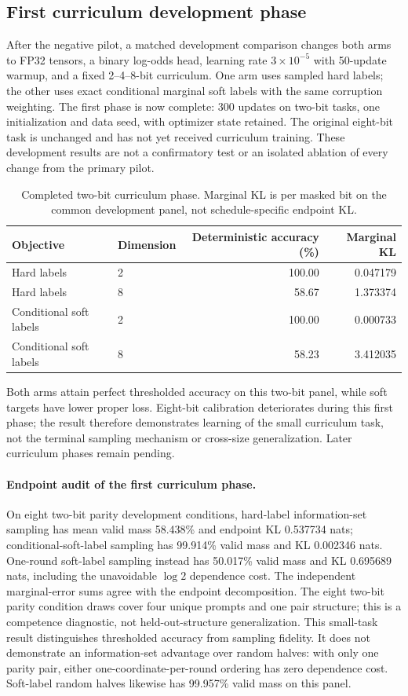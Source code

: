 \subsection{First curriculum development phase}
After the negative pilot, a matched development comparison changes both arms to FP32 tensors, a binary log-odds head, learning rate $3\times10^{-5}$ with 50-update warmup, and a fixed 2--4--8-bit curriculum. One arm uses sampled hard labels; the other uses exact conditional marginal soft labels with the same corruption weighting. The first phase is now complete: 300 updates on two-bit tasks, one initialization and data seed, with optimizer state retained. The original eight-bit task is unchanged and has not yet received curriculum training. These development results are not a confirmatory test or an isolated ablation of every change from the primary pilot.
\begin{table}[htbp]\centering\small
\caption{Completed two-bit curriculum phase. Marginal KL is per masked bit on the common development panel, not schedule-specific endpoint KL.}
\begin{tabular}{@{}llrr@{}}\toprule
Objective & Dimension & Deterministic accuracy (\%) & Marginal KL\\\midrule
Hard labels & 2 & 100.00 & 0.047179\\
Hard labels & 8 & 58.67 & 1.373374\\
Conditional soft labels & 2 & 100.00 & 0.000733\\
Conditional soft labels & 8 & 58.23 & 3.412035\\
\bottomrule\end{tabular}\end{table}
Both arms attain perfect thresholded accuracy on this two-bit panel, while soft targets have lower proper loss. Eight-bit calibration deteriorates during this first phase; the result therefore demonstrates learning of the small curriculum task, not the terminal sampling mechanism or cross-size generalization. Later curriculum phases remain pending.

\paragraph{Endpoint audit of the first curriculum phase.}
On eight two-bit parity development conditions, hard-label information-set sampling has mean valid mass 58.438\% and endpoint KL 0.537734 nats; conditional-soft-label sampling has 99.914\% valid mass and KL 0.002346 nats. One-round soft-label sampling instead has 50.017\% valid mass and KL 0.695689 nats, including the unavoidable $\log2$ dependence cost. The independent marginal-error sums agree with the endpoint decomposition. The eight two-bit parity condition draws cover four unique prompts and one pair structure; this is a competence diagnostic, not held-out-structure generalization. This small-task result distinguishes thresholded accuracy from sampling fidelity. It does not demonstrate an information-set advantage over random halves: with only one parity pair, either one-coordinate-per-round ordering has zero dependence cost. Soft-label random halves likewise has 99.957\% valid mass on this panel.

